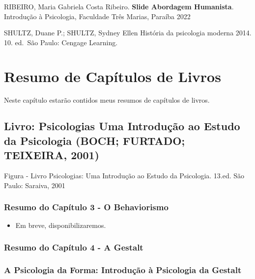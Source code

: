 \documentclass[
]{book}
\providecommand{\tightlist}{%
  \setlength{\itemsep}{0pt}\setlength{\parskip}{0pt}}
\begin{document}
RIBEIRO, Maria Gabriela Costa Ribeiro. \textbf{Slide Abordagem Humanista}. Introdução à Psicologia, Faculdade Três Marias, Paraíba 2022

SHULTZ, Duane P.; SHULTZ, Sydney Ellen História da psicologia moderna 2014. 10. ed.~São Paulo: Cengage Learning.

\hypertarget{resumo-de-capuxedtulos-de-livros}{%
\chapter{Resumo de Capítulos de Livros}\label{resumo-de-capuxedtulos-de-livros}}

Neste capítulo estarão contidos meus resumos de capítulos de livros.

\hypertarget{livro-psicologias-uma-introduuxe7uxe3o-ao-estudo-da-psicologia-boch-furtado-teixeira-2001}{%
\section{\texorpdfstring{Livro: \textbf{Psicologias Uma Introdução ao Estudo da Psicologia} (BOCH; FURTADO; TEIXEIRA, 2001)}{Livro: Psicologias Uma Introdução ao Estudo da Psicologia (BOCH; FURTADO; TEIXEIRA, 2001)}}\label{livro-psicologias-uma-introduuxe7uxe3o-ao-estudo-da-psicologia-boch-furtado-teixeira-2001}}

Figura - Livro Psicologias: Uma Introdução ao Estudo da Psicologia. 13.ed. São Paulo: Saraiva, 2001

\hypertarget{resumo-do-capuxedtulo-3---o-behaviorismo}{%
\subsection{Resumo do Capítulo 3 - O Behaviorismo}\label{resumo-do-capuxedtulo-3---o-behaviorismo}}

\begin{itemize}
\tightlist
\item
  Em breve, disponibilizaremos.
\end{itemize}

\hypertarget{resumo-do-capuxedtulo-4---a-gestalt}{%
\subsection{Resumo do Capítulo 4 - A Gestalt}\label{resumo-do-capuxedtulo-4---a-gestalt}}

\hypertarget{a-psicologia-da-forma-introduuxe7uxe3o-uxe0-psicologia-da-gestalt}{%
\subsection{A Psicologia da Forma: Introdução à Psicologia da Gestalt}\label{a-psicologia-da-forma-introduuxe7uxe3o-uxe0-psicologia-da-gestalt}}
\end{document}
